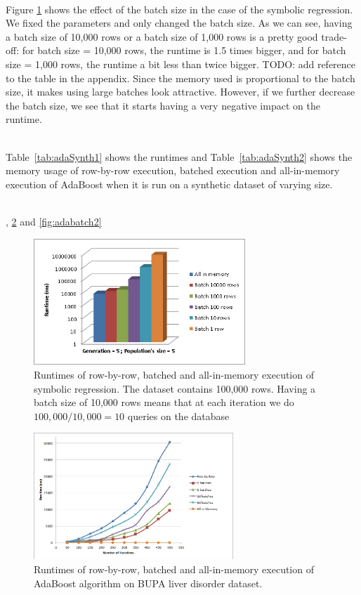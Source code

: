 ~~\\
Figure \ref{fig:gp-batch-histo} shows the effect of the batch size in the case of the symbolic regression. We fixed the parameters and only changed the batch size. As we can see, having a batch size of 10,000 rows or a batch size of 1,000 rows is a pretty good trade-off: for batch size = 10,000 rows, the runtime is 1.5  times bigger, and for batch size = 1,000 rows, the runtime a bit less than twice bigger. TODO: add reference to the table in the appendix. Since the memory used is proportional to the batch size, it makes using large batches look attractive. However, if we further decrease the batch size, we see that it starts having a very negative impact on the runtime.

~~\\
Table~\ref{tab:adaSynth1} shows the runtimes and Table~\ref{tab:adaSynth2} shows the memory usage of row-by-row execution, batched execution and all-in-memory execution of AdaBoost when it is run on a synthetic dataset of varying size. 

~~\\
, \ref{fig:adabatch1} and \ref{fig:adabatch2} 

\begin{figure}[ht]
\centering
\includegraphics[height=180px]{gp-batch-histo.png}
\caption{Runtimes of row-by-row, batched and all-in-memory execution of symbolic regression. The dataset contains 100,000 rows. Having a batch size of 10,000 rows means that at each iteration we do $100,000/10,000 = 10$ queries on the database}
\label{fig:gp-batch-histo}
\end{figure}

\begin{figure}[ht]
\centering
\includegraphics[height=180px]{ada2.png}
\caption{Runtimes of row-by-row, batched and all-in-memory execution of AdaBoost algorithm on BUPA liver disorder dataset.}
\label{fig:adabatch1}
\end{figure}

